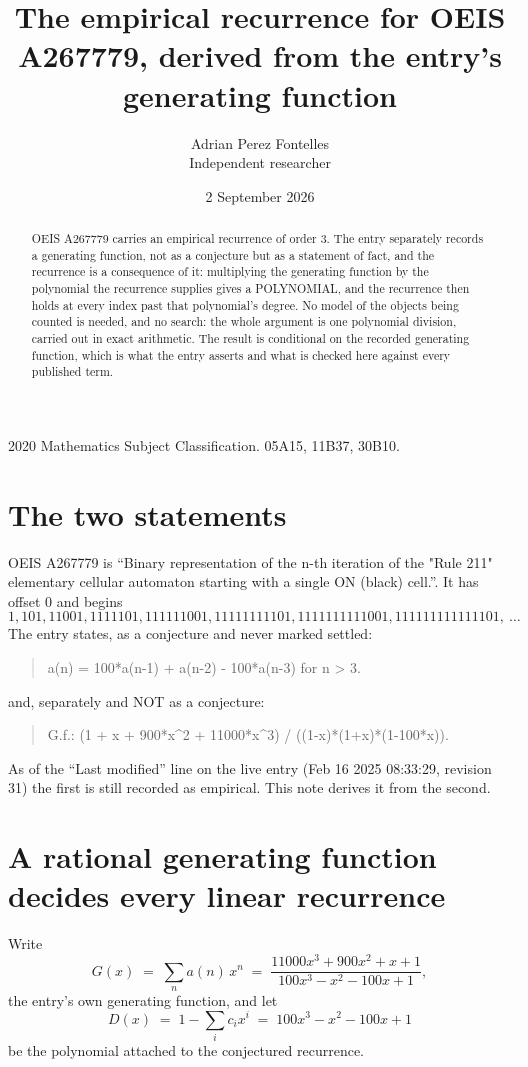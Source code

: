 \documentclass[11pt,a4paper]{article}
\title{The empirical recurrence for OEIS A267779, derived from the entry's generating function}
\author{Adrian Perez Fontelles\\ \small Independent researcher}
\date{2 September 2026}
\theoremstyle{plain}
\theoremstyle{definition}
\begin{document}
\maketitle

\begin{abstract}
OEIS A267779 carries an empirical recurrence of order $3$. The entry separately records a
generating function, not as a conjecture but as a statement of fact, and the recurrence is a
consequence of it: multiplying the generating function by the polynomial the recurrence
supplies gives a POLYNOMIAL, and the recurrence then holds at every index past that
polynomial's degree. No model of the objects being counted is needed, and no search: the
whole argument is one polynomial division, carried out in exact arithmetic. The result is
conditional on the recorded generating function, which is what the entry asserts and what is
checked here against every published term.
\end{abstract}

\noindent\small 2020 Mathematics Subject Classification. 05A15, 11B37, 30B10.\normalsize

\section{The two statements}

OEIS A267779 is ``Binary representation of the n-th iteration of the "Rule 211" elementary cellular automaton starting with a single ON (black) cell.''. It has offset $0$ and begins
\[
1, 101, 11001, 1111101, 111111001, 11111111101, 1111111111001, 111111111111101,\ \dots
\]
The entry states, as a conjecture and never marked settled:
\begin{quote}
a(n) = 100*a(n-1) + a(n-2) - 100*a(n-3) for n > 3.
\end{quote}
and, separately and NOT as a conjecture:
\begin{quote}
G.f.: (1 + x + 900*x\^{}2 + 11000*x\^{}3) / ((1-x)*(1+x)*(1-100*x)).
\end{quote}
As of the ``Last modified'' line on the live entry (Feb 16 2025 08:33:29, revision 31) the first is still
recorded as empirical. This note derives it from the second.

\section{A rational generating function decides every linear recurrence}

Write
\[
G(x)\;=\;\sum_{n}a(n)\,x^{n}\;=\;\frac{11000 x^{3} + 900 x^{2} + x + 1}{100 x^{3} - x^{2} - 100 x + 1},
\]
the entry's own generating function, and let
\[
D(x)\;=\;1-\sum_i c_i x^{i}\;=\;100 x^{3} - x^{2} - 100 x + 1
\]
be the polynomial attached to the conjectured recurrence.
\end{document}
